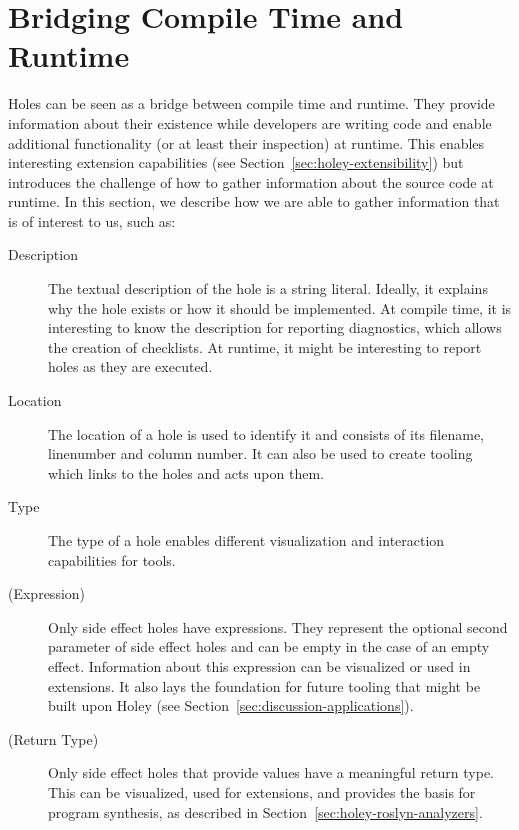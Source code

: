 \section{Bridging Compile Time and Runtime}
\label{sec:holey-bridging-compile-and-runtime}
Holes can be seen as a bridge between compile time and runtime.
They provide information about their existence while developers are writing code and enable additional functionality (or at least their inspection) at runtime.
This enables interesting extension capabilities (see Section~\ref{sec:holey-extensibility}) but introduces the challenge of how to gather information about the source code at runtime.
In this section, we describe how we are able to gather information that is of interest to us, such as:
\begin{description}
    \item[Description] The textual description of the hole is a string literal. Ideally, it explains why the hole exists or how it should be implemented. At compile time, it is interesting to know the description for reporting diagnostics, which allows the creation of checklists. At runtime, it might be interesting to report holes as they are executed.
    \item[Location] The location of a hole is used to identify it and consists of its filename, linenumber and column number. It can also be used to create tooling which links to the holes and acts upon them.
    \item[Type] The type of a hole enables different visualization and interaction capabilities for tools.
    \item[(Expression)] Only side effect holes have expressions. They represent the optional second parameter of side effect holes and can be empty in the case of an empty effect. Information about this expression can be visualized or used in extensions. It also lays the foundation for future tooling that might be built upon Holey (see Section~\ref{sec:discussion-applications}).
    \item[(Return Type)] Only side effect holes that provide values have a meaningful return type. This can be visualized, used for extensions, and provides the basis for program synthesis, as described in Section~\ref{sec:holey-roslyn-analyzers}.
\end{description}


